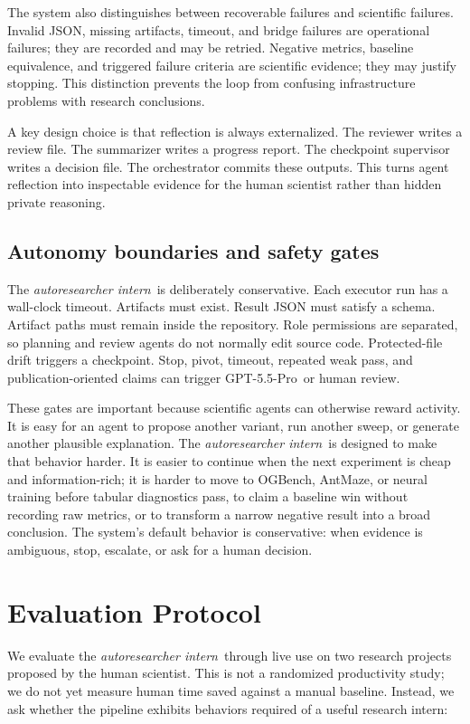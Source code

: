 \documentclass{article}
\newcommand{\intern}{\emph{autoresearcher intern}}
\newcommand{\gptpro}{GPT-5.5-Pro}
\begin{document}
The system also distinguishes between recoverable failures and scientific failures. Invalid JSON, missing artifacts, timeout, and bridge failures are operational failures; they are recorded and may be retried. Negative metrics, baseline equivalence, and triggered failure criteria are scientific evidence; they may justify stopping. This distinction prevents the loop from confusing infrastructure problems with research conclusions.

A key design choice is that reflection is always externalized. The reviewer writes a review file. The summarizer writes a progress report. The checkpoint supervisor writes a decision file. The orchestrator commits these outputs. This turns agent reflection into inspectable evidence for the human scientist rather than hidden private reasoning.

\subsection{Autonomy boundaries and safety gates}

The \intern\ is deliberately conservative. Each executor run has a wall-clock timeout. Artifacts must exist. Result JSON must satisfy a schema. Artifact paths must remain inside the repository. Role permissions are separated, so planning and review agents do not normally edit source code. Protected-file drift triggers a checkpoint. Stop, pivot, timeout, repeated weak pass, and publication-oriented claims can trigger \gptpro\ or human review.

These gates are important because scientific agents can otherwise reward activity. It is easy for an agent to propose another variant, run another sweep, or generate another plausible explanation. The \intern\ is designed to make that behavior harder. It is easier to continue when the next experiment is cheap and information-rich; it is harder to move to OGBench, AntMaze, or neural training before tabular diagnostics pass, to claim a baseline win without recording raw metrics, or to transform a narrow negative result into a broad conclusion. The system's default behavior is conservative: when evidence is ambiguous, stop, escalate, or ask for a human decision.

\section{Evaluation Protocol}

We evaluate the \intern\ through live use on two research projects proposed by the human scientist. This is not a randomized productivity study; we do not yet measure human time saved against a manual baseline. Instead, we ask whether the pipeline exhibits behaviors required of a useful research intern:
\end{document}
